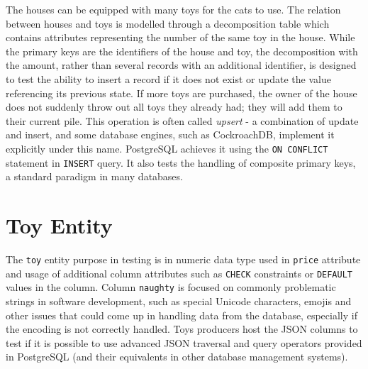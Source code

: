The houses can be equipped with many toys for the cats to use. The relation
between houses and toys is modelled through a decomposition table which contains
attributes representing the number of the same toy in the house. While the
primary keys are the identifiers of the house and toy, the decomposition with
the amount, rather than several records with an additional identifier, is
designed to test the ability to insert a record if it does not exist or update
the value referencing its previous state. If more toys are purchased, the owner
of the house does not suddenly throw out all toys they already had; they will
add them to their current pile. This operation is often called \textit{upsert} -
a combination of update and insert, and some database engines, such as
CockroachDB, implement it explicitly under this name. PostgreSQL achieves it
using the \texttt{ON CONFLICT} statement in \texttt{INSERT} query. It also tests
the handling of composite primary keys, a standard paradigm in many databases.

\section{Toy Entity}
The \texttt{toy} entity purpose in testing is in numeric data type used in
\texttt{price} attribute and usage of additional column attributes such as
\texttt{CHECK} constraints or \texttt{DEFAULT} values in the column. Column
\texttt{naughty} is focused on commonly problematic strings in software
development, such as special Unicode characters, emojis and other issues that
could come up in handling data from the database, especially if the encoding is
not correctly handled. Toys producers host the JSON columns to test if it is
possible to use advanced JSON traversal and query operators provided in
PostgreSQL (and their equivalents in other database management systems).
